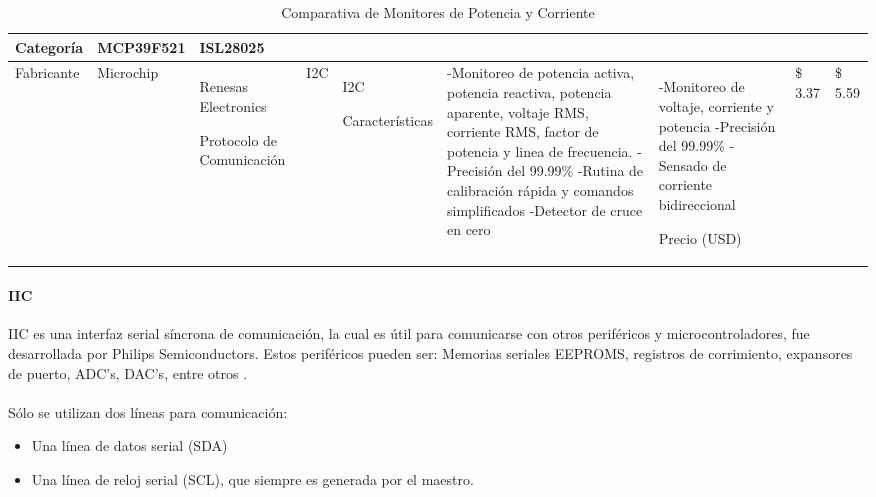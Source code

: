 \begin{longtable}{|M{2.2cm}|M{4.0cm}|M{4.0cm}|M{4.0cm}|}
    \caption{Comparativa de Monitores de Potencia y Corriente}
    \label{tabla_modulosWiFi}
	\hline
	\textbf{Categoría} & \textbf{MCP39F521} & \textbf{ISL28025} \\ \hline
	
 	Fabricante & Microchip & Renesas Electronics
 	\hline
 	 
    Protocolo de Comunicación 
    &
    \newline  I2C
	& 
    \newline  I2C
    \hline

	Características

    &
	\newline -Monitoreo de potencia activa, potencia reactiva, potencia aparente, voltaje RMS, corriente RMS, factor de potencia y linea de frecuencia. 
	\newline -Precisión del 99.99\%
	\newline -Rutina de calibración rápida y comandos simplificados
	\newline -Detector de cruce en cero

	&
	\newline -Monitoreo de voltaje, corriente y potencia 
	\newline -Precisión del 99.99\%
	\newline -Sensado de corriente bidireccional
	\hline
	
	Precio (USD) 
	
	&
	\newline \$ 3.37
	&
	\newline \$ 5.59
	\hline

\end{longtable}


\paragraph{IIC}
IIC es una interfaz serial síncrona de comunicación, la cual es útil para comunicarse  con otros periféricos y microcontroladores, fue desarrollada por Philips Semiconductors.
Estos periféricos pueden ser: Memorias seriales EEPROMS, registros de corrimiento, expansores de puerto, ADC's, DAC's, entre otros \citep{MarcoTeorico17}.
\paragraph{}
Sólo se utilizan dos líneas para comunicación:
\begin{itemize}
	\item Una línea de datos serial (SDA)
    \item Una línea de reloj serial (SCL), que siempre es generada por el maestro.
\end{itemize}

